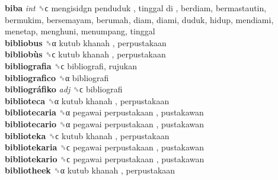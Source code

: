 \textbf{biba} \emph{int}  ␝ϲ   mengisidgn penduduk ,  tinggal di , berdiam, bermastautin, bermukim, bersemayam, berumah, diam, diami, duduk, hidup, mendiami, menetap, menghuni, menumpang, tinggal  \\
\textbf{bibliobus} ␝α   kutub khanah , perpustakaan  \\
\textbf{bibliobùs} ␝ϲ   kutub khanah , perpustakaan  \\
\textbf{bibliografia} ␝ϲ  bibliografi, rujukan  \\
\textbf{bibliografico} ␝α  bibliografi  \\
\textbf{bibliográfiko} \emph{adj}  ␝ϲ  bibliografi  \\
\textbf{biblioteca} ␝α   kutub khanah , perpustakaan  \\
\textbf{bibliotecaria} ␝α   pegawai perpustakaan , pustakawan  \\
\textbf{bibliotecario} ␝α   pegawai perpustakaan , pustakawan  \\
\textbf{biblioteka} ␝ϲ   kutub khanah , perpustakaan  \\
\textbf{bibliotekaria} ␝ϲ   pegawai perpustakaan , pustakawan  \\
\textbf{bibliotekario} ␝ϲ   pegawai perpustakaan , pustakawan  \\
\textbf{bibliotheek} ␝α   kutub khanah , perpustakaan  \\
